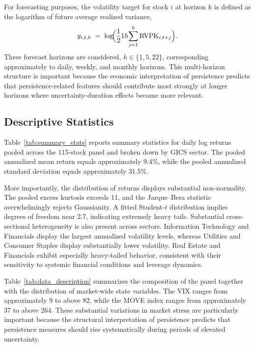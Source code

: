 \documentclass[unnumsec,webpdf,contemporary,large]{oup-authoring-template}%
\theoremstyle{thmstyleone}%
\theoremstyle{thmstyletwo}%
\theoremstyle{thmstylethree}%
\begin{document}
For forecasting purposes, the volatility target for stock $i$ at horizon
$h$ is defined as the logarithm of future average realized variance,
\begin{equation}
  y_{i,t,h} \;=\; \log\!\Bigl(\frac{1}{2}{1}{h}\!\sum_{j=1}^{h}
  \mathrm{RVPK}_{i,t+j}\Bigr).
\end{equation}
Three forecast horizons are considered, $h\in\{1,5,22\}$, corresponding
approximately to daily, weekly, and monthly horizons. This multi-horizon
structure is important because the economic interpretation of persistence
predicts that persistence-related features should contribute most strongly
at longer horizons where uncertainty-duration effects become more relevant.

\subsection{Descriptive Statistics}

Table~\ref{tab:summary_stats} reports summary statistics for daily log
returns pooled across the 115-stock panel and broken down by GICS sector.
The pooled annualized mean return equals approximately 9.4\%, while the
pooled annualized standard deviation equals approximately 31.5\%.

More importantly, the distribution of returns displays substantial
non-normality. The pooled excess kurtosis exceeds 11, and the Jarque--Bera
statistic overwhelmingly rejects Gaussianity. A fitted Student-$t$
distribution implies degrees of freedom near 2.7, indicating extremely
heavy tails. Substantial cross-sectional heterogeneity is also present
across sectors. Information Technology and Financials display the largest
annualized volatility levels, whereas Utilities and Consumer Staples
display substantially lower volatility. Real Estate and Financials exhibit
especially heavy-tailed behavior, consistent with their sensitivity to
systemic financial conditions and leverage dynamics.





Table~\ref{tab:data_description} summarizes the composition of the panel
together with the distribution of market-wide state variables. The VIX
ranges from approximately 9 to above 82, while the MOVE index ranges from
approximately 37 to above 264. These substantial variations in market
stress are particularly important because the structural interpretation of
persistence predicts that persistence measures should rise systematically
during periods of elevated uncertainty.
\end{document}
